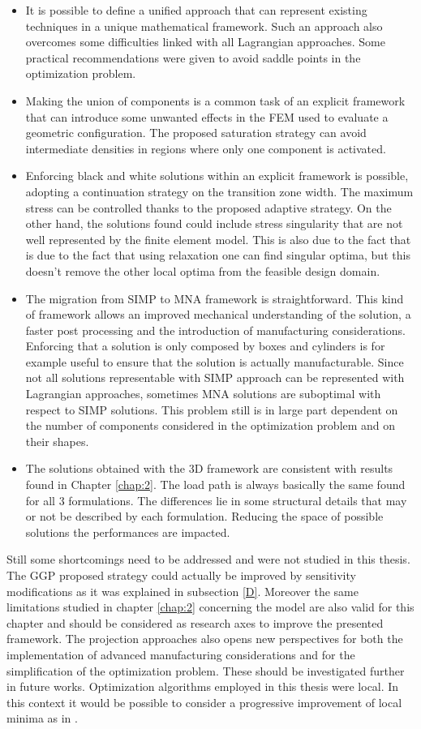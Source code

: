 \begin{itemize}
\item It is possible to define a unified approach that can represent existing techniques in a unique mathematical framework. Such an approach also overcomes some difficulties linked with all Lagrangian approaches. Some practical recommendations were given to avoid saddle points in the optimization problem. 
\item Making the union of components is a common task of an explicit framework that can introduce some unwanted effects in the FEM used to evaluate a geometric configuration. The proposed saturation strategy can avoid intermediate densities in regions where only one component is activated.
\item Enforcing black and white solutions within an explicit framework is possible, adopting a continuation strategy on the transition zone width. The maximum stress can be controlled thanks to the proposed adaptive strategy. On the other hand, the solutions found could include stress singularity that are not well represented by the finite element model. This is also due to the fact that is due to the fact that using relaxation one can find singular optima, but this doesn't remove the other local optima from the feasible design domain.
\item The migration from SIMP to MNA framework is straightforward. This kind of framework allows an improved mechanical understanding of the solution, a faster post processing and the introduction of manufacturing considerations. Enforcing that a solution is only composed by boxes and cylinders is for example useful to ensure that the solution is actually manufacturable. Since not all solutions representable with SIMP approach can be represented with Lagrangian approaches, sometimes MNA solutions are suboptimal with respect to SIMP solutions. This problem still is in large part dependent on the number of components considered in the optimization problem and on their shapes. 
\item The solutions obtained with the 3D framework are consistent with results found in Chapter \ref{chap:2}. The load path is always basically the same found for all 3 formulations. The differences lie in some structural details that may or not be described by each formulation. Reducing the space of possible solutions the performances are impacted.  
\end{itemize}
Still some shortcomings need to be addressed and were not studied in this thesis. The GGP proposed strategy could actually be improved by sensitivity modifications as it was explained in subsection \ref{D}. Moreover the same limitations studied in chapter \ref{chap:2} concerning the model are also valid for this chapter and should be considered as research axes to improve the presented framework. The projection approaches also opens new perspectives for both the implementation of advanced manufacturing considerations and for the simplification of the optimization problem. These should be investigated further in future works. Optimization algorithms employed in this thesis were local. In this context it would be possible to consider a progressive improvement of local minima as in \cite{zhang2018finding}.


